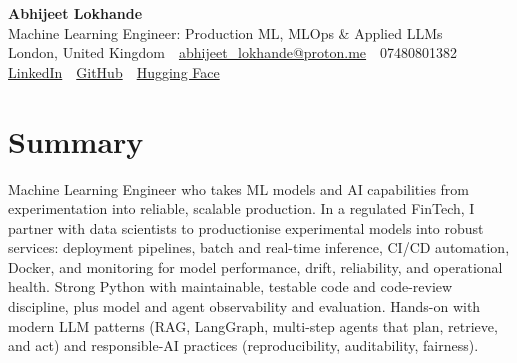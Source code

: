 \documentclass[10pt,a4paper]{article}
\newcommand{\sep}{\,\textcolor{accent!60}{\textbar}\,}
\begin{document}
\begin{center}
  {\fontsize{24}{26}\selectfont\bfseries Abhijeet Lokhande}\\[3pt]
  {\color{accent}\large Machine Learning Engineer: Production ML, MLOps \& Applied LLMs}\\[5pt]
  {\small
    London, United Kingdom \sep
    \href{mailto:abhijeet_lokhande@proton.me}{abhijeet\_lokhande@proton.me} \sep
    07480801382 \\[2pt]
    \href{https://www.linkedin.com/in/ablds/}{LinkedIn} \sep
    \href{https://github.com/abhijeetscode}{GitHub} \sep
    \href{https://huggingface.co/ab-ai}{Hugging Face}
  }
\end{center}
\vspace{2pt}

\section{Summary}
Machine Learning Engineer who takes ML models and AI capabilities from experimentation into reliable, scalable production. In a regulated FinTech, I partner with data scientists to productionise experimental models into robust services: deployment pipelines, batch and real-time inference, CI/CD automation, Docker, and monitoring for model performance, drift, reliability, and operational health. Strong Python with maintainable, testable code and code-review discipline, plus model and agent observability and evaluation. Hands-on with modern LLM patterns (RAG, LangGraph, multi-step agents that plan, retrieve, and act) and responsible-AI practices (reproducibility, auditability, fairness).

\end{document}
